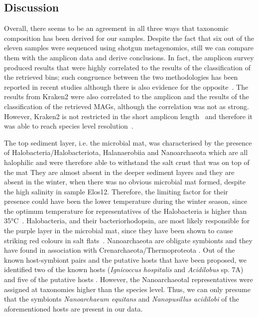 \subsection{Discussion}
\label{swamp:discussion}

   Overall, there seems to be an agreement in all three ways that taxonomic composition has been derived for our samples. 
   Despite the fact that six out of the eleven samples were sequenced using shotgun metagenomics, 
   still we can compare them with the amplicon data and derive conclusions. In fact, the amplicon survey produced results 
   that were highly correlated to the results of the classification of the retrieved bins; 
   such congruence between the two methodologies has been reported in recent studies 
   \citep{chan_diversity_2015, regalado_combining_2020}
   although there is also evidence for the opposite~\citep{tessler_large-scale_2017}. 
   The results from Kraken2 were also correlated to the amplicon and the results of the classification of the retrieved MAGs, 
   although the correlation was not as strong. 
   However, Kraken2 is not restricted in the short amplicon length~\citep{johnson_evaluation_2019} 
   and therefore it was able to reach species level resolution~\citep{lu_ultrafast_2020}.

   The top sediment layer, i.e. the microbial mat, was characterised by the presence of Halobacteria/Halobacteriota, 
   Halanaerobiia and Nanoarchaeota which are all halophilic and were therefore able 
   to withstand the salt crust that was on top of the mat 
   \citep{norton_archaeal_1993, casanueva_nanoarchaeal_2008, cinar_prokaryotic_2020, akpolat_prokaryotic_2021}
   They are almost absent in the deeper sediment layers and they are absent in the winter, 
   when there was no obvious microbial mat formed, despite the high salinity in sample Elos12. 
   Therefore, the limiting factor for their presence could have been the lower temperature during the winter season, 
   since the optimum temperature for representatives of the Halobacteria is higher than 35°C~\citep{grant_halobacterium_2015}. 
   Halobacteria, and their bacteriorhodopsin, are most likely responsible for the purple layer in the microbial mat, 
   since they have been shown to cause striking red colours in salt flats~\citep{stoeckenius_bacteriorhodopsin_1979}. 
   Nanoarchaeota are obligate symbionts and they have found in association with Crenarchaeota/Thermoproteota 
   \citep{huber_new_2002, podar_insights_2013, munson-mcgee_nanoarchaeota_2015, wurch_genomics-informed_2016, merkel_microbial_2017}.
   Out of the known host-symbiont pairs and the putative hosts that have been proposed, we identified two of the known hosts 
   (\textit{Ignicoccus hospitalis} and \textit{Acidilobus} sp. 7A) 
   and five of the putative hosts \citep{jarett_single-cell_2018}. 
   However, the Nanoarchaeotal representatives were assigned at taxonomies higher than the species level. 
   Thus, we can only presume that the symbionts \textit{Nanoarchaeum equitans} and \textit{Nanopusillus acidilobi} 
   of the aforementioned hosts are present in our data. 

